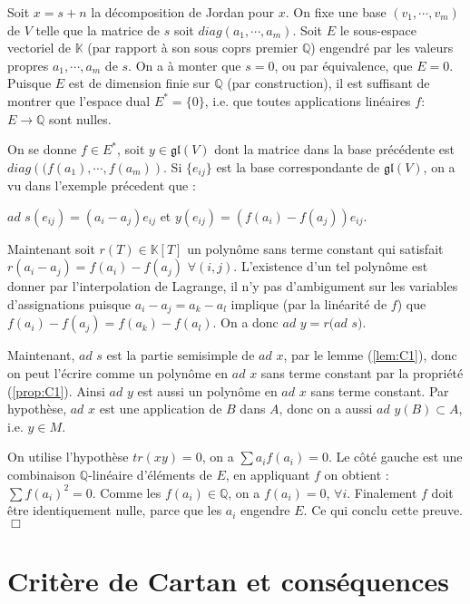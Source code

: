 \documentclass[a4paper,openany,12pt]{report}
\newcommand{\KK}{\mathbb{K}}
\newcommand{\QQ}{\mathbb{Q}}
\newcommand{\gl}{\mathfrak{gl}}
\theoremstyle{break}
{\theorembodyfont{\upshape}
\newtheorem*{rmq}{Remarque :}
\newtheorem*{prv}{Preuve :}
\newtheorem*{ex}{Exemples :}
\newtheorem*{exe}{Exemple : }
\newtheorem*{nota}{Notation :}
\newtheorem*{dem}{D\'emonstration :}}
\begin{document}
\begin{prv}
\quad Soit $x=s+n$ la décomposition de Jordan pour $x$. On fixe une base $(v_{1},\cdots,v_{m})$ de $V$ telle que la matrice de $s$ soit $diag(a_{1}, \cdots,a_{m})$. Soit $E$ le sous-espace vectoriel de $\KK$ (par rapport à son sous coprs premier $\QQ$) engendré par les valeurs propres $a_{1},\cdots,a_{m}$ de $s$. On a à monter que $s=0$, ou par équivalence, que $E=0$. Puisque $E$ est de dimension finie sur $\QQ$ (par construction), il est suffisant de montrer que l'espace dual $E^{*}= \{0\}$, i.e. que toutes applications linéaires $f:$ $E \to \QQ$ sont nulles. 

On se donne $f \in E^{*}$, soit $y \in \gl(V)$ dont la matrice dans la base précédente est $diag\left( (f(a_{1}),\cdots,f(a_{m}) \right)$. Si $\{ e_{ij} \}$ est la base correspondante de $\gl(V)$, on a vu dans l'exemple précedent que :
\begin{center}
$ad$ $s(e_{ij}) = (a_{i} - a_{j})e_{ij}$ et $y(e_{ij}) = (f(a_{i})-f(a_{j}))e_{ij}$.
\end{center}

Maintenant soit $r(T) \in \KK[T]$ un polynôme sans terme constant qui satisfait $r(a_{i}-a_{j}) = f(a_{i})-f(a_{j})$ $\forall (i,j)$. L’existence d'un tel polynôme est donner par l’interpolation de Lagrange, il n'y pas d’ambigument sur les variables d'assignations puisque $a_{i} - a_{j} = a_{k} -a_{l}$ implique (par la linéarité de $f$) que $f(a_{i}) - f(a_{j}) = f(a_{k}) -f(a_{l})$. On a donc $ad$ $y= r(ad$ $s)$.

Maintenant, $ad$ $s$ est la partie semisimple de $ad$ $x$, par le lemme (\ref{lem:C1}), donc on peut l'écrire comme un polynôme en $ad$ $x$ sans terme constant par la propriété (\ref{prop:C1}). Ainsi $ad$ $y$ est aussi un polynôme en $ad$ $x$ sans terme constant. Par hypothèse, $ad$ $x$ est une application de $B$ dans $A$, donc on a aussi $ad$ $y(B) \subset A$, i.e. $y \in M$.

On utilise l'hypothèse $tr(xy)=0$, on a $\sum a_{i}f(a_{i}) = 0$. Le côté gauche est une combinaison $\QQ$-linéaire d'éléments de $E$, en appliquant $f$ on obtient : $\sum f(a_{i})^2 = 0$. Comme les $f(a_{i}) \in \QQ$, on a $f(a_{i})=0$, $\forall i$. Finalement $f$ doit être identiquement nulle, parce que les $a_{i}$ engendre $E$. Ce qui conclu cette preuve. $\Box$
\end{prv}

\section{Critère de Cartan et conséquences}\label{c}
\end{document}
